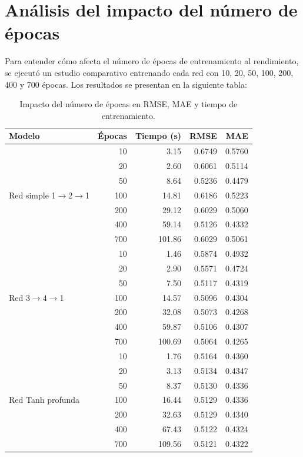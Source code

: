 \documentclass[11pt]{article}
\begin{document}
\section{Análisis del impacto del número de épocas}
Para entender cómo afecta el número de épocas de entrenamiento al rendimiento, se ejecutó un estudio comparativo entrenando cada red con 10, 20, 50, 100, 200, 400 y 700 épocas. Los resultados se presentan en la siguiente tabla:

\begin{table}[h]
\centering
\begin{tabular}{lrrrr}
\toprule
Modelo & Épocas & Tiempo (s) & RMSE & MAE \\
\midrule
\multirow{7}{*}{Red simple 1$\rightarrow$2$\rightarrow$1} & 10 & 3.15 & 0.6749 & 0.5760 \\
& 20 & 2.60 & 0.6061 & 0.5114 \\
& 50 & 8.64 & 0.5236 & 0.4479 \\
& 100 & 14.81 & 0.6186 & 0.5223 \\
& 200 & 29.12 & 0.6029 & 0.5060 \\
& 400 & 59.14 & 0.5126 & 0.4332 \\
& 700 & 101.86 & 0.6029 & 0.5061 \\
\midrule
\multirow{7}{*}{Red 3$\rightarrow$4$\rightarrow$1} & 10 & 1.46 & 0.5874 & 0.4932 \\
& 20 & 2.90 & 0.5571 & 0.4724 \\
& 50 & 7.50 & 0.5117 & 0.4319 \\
& 100 & 14.57 & 0.5096 & 0.4304 \\
& 200 & 32.08 & 0.5073 & 0.4268 \\
& 400 & 59.87 & 0.5106 & 0.4307 \\
& 700 & 100.69 & 0.5064 & 0.4265 \\
\midrule
\multirow{7}{*}{Red Tanh profunda} & 10 & 1.76 & 0.5164 & 0.4360 \\
& 20 & 3.13 & 0.5134 & 0.4347 \\
& 50 & 8.37 & 0.5130 & 0.4336 \\
& 100 & 16.44 & 0.5129 & 0.4336 \\
& 200 & 32.63 & 0.5129 & 0.4340 \\
& 400 & 67.43 & 0.5122 & 0.4324 \\
& 700 & 109.56 & 0.5121 & 0.4322 \\
\bottomrule
\end{tabular}
\caption{Impacto del número de épocas en RMSE, MAE y tiempo de entrenamiento.}
\label{tab:epochs}
\end{table}
\end{document}
